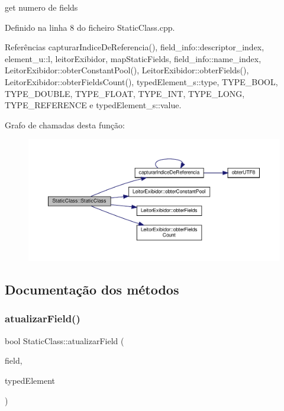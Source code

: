 get numero de fields 

Definido na linha 8 do ficheiro Static\+Class.\+cpp.



Referências capturar\+Indice\+De\+Referencia(), field\+\_\+info\+::descriptor\+\_\+index, element\+\_\+u\+::l, leitor\+Exibidor, map\+Static\+Fields, field\+\_\+info\+::name\+\_\+index, Leitor\+Exibidor\+::obter\+Constant\+Pool(), Leitor\+Exibidor\+::obter\+Fields(), Leitor\+Exibidor\+::obter\+Fields\+Count(), typed\+Element\+\_\+s\+::type, T\+Y\+P\+E\+\_\+\+B\+O\+OL, T\+Y\+P\+E\+\_\+\+D\+O\+U\+B\+LE, T\+Y\+P\+E\+\_\+\+F\+L\+O\+AT, T\+Y\+P\+E\+\_\+\+I\+NT, T\+Y\+P\+E\+\_\+\+L\+O\+NG, T\+Y\+P\+E\+\_\+\+R\+E\+F\+E\+R\+E\+N\+CE e typed\+Element\+\_\+s\+::value.

Grafo de chamadas desta função\+:
\nopagebreak
\begin{figure}[H]
\begin{center}
\leavevmode
\includegraphics[width=350pt]{classStaticClass_a328a35510e7d0b0811a976bc989d195a_cgraph}
\end{center}
\end{figure}


\subsection{Documentação dos métodos}
\mbox{\label{classStaticClass_aa0d9a3db46155bf6971476a22c4f2eaa}} 
\subsubsection{\texorpdfstring{atualizar\+Field()}{atualizarField()}}
{\footnotesize\ttfamily bool Static\+Class\+::atualizar\+Field (\begin{DoxyParamCaption}\item[{string}]{field,  }\item[{\hyperlink{BasicTypes_8h_a97b332303b1262282599e6ede0637b82}{Typed\+Element}}]{typed\+Element }\end{DoxyParamCaption})}



